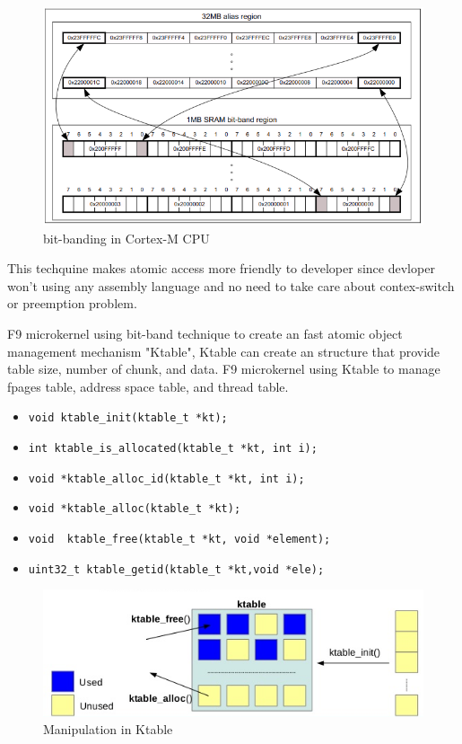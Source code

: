 \documentclass[10pt,preprint,nocopyrightspace]{sigplanconf}
\begin{document}
\begin{figure}[H]
\begin{center}
	\includegraphics[width=\linewidth]{picture/bit-banding.png}
\end{center}
\caption{bit-banding in Cortex-M CPU\cite{st2016manual}}
\end{figure}

This techquine makes atomic access more friendly to developer since devloper won't using any assembly language and no need to take care about contex-switch or preemption problem.

F9 microkernel using bit-band technique to create an fast atomic object management mechanism "Ktable", Ktable can create an structure that provide table size, number of chunk, and data. F9 microkernel using Ktable to manage fpages table, address space table, and thread table.

\begin{itemize}
\footnotesize
\item \verb|void ktable_init(ktable_t *kt);|
\item \verb|int ktable_is_allocated(ktable_t *kt, int i);|
\item \verb|void *ktable_alloc_id(ktable_t *kt, int i);|
\item \verb|void *ktable_alloc(ktable_t *kt);|
\item \verb|void  ktable_free(ktable_t *kt, void *element);|
\item \verb|uint32_t ktable_getid(ktable_t *kt,void *ele);|
\end{itemize}


\begin{figure}[H]
	\begin{center}
		\includegraphics[width=\linewidth]{picture/ktable.png}
	\end{center}
	\caption{Manipulation in Ktable\cite{ncku2015}}
\end{figure}
\end{document}
